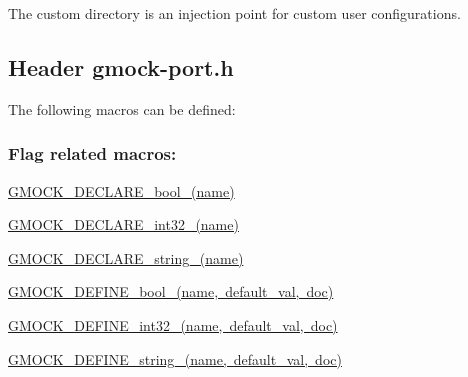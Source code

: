 The custom directory is an injection point for custom user configurations.

\subsection*{Header {\ttfamily gmock-\/port.\+h}}

The following macros can be defined\+:

\subsubsection*{Flag related macros\+:}


\begin{DoxyItemize}
\item {\ttfamily \mbox{\hyperlink{gmock-port_8h_a7a0a953221ea8ef5aaa6c644a48af599}{G\+M\+O\+C\+K\+\_\+\+D\+E\+C\+L\+A\+R\+E\+\_\+bool\+\_\+(name)}}}
\item {\ttfamily \mbox{\hyperlink{gmock-port_8h_adeb7f0a8d842d1d541615763835af3f9}{G\+M\+O\+C\+K\+\_\+\+D\+E\+C\+L\+A\+R\+E\+\_\+int32\+\_\+(name)}}}
\item {\ttfamily \mbox{\hyperlink{gmock-port_8h_a35af08c45131cf68d78446cb8cfe40fe}{G\+M\+O\+C\+K\+\_\+\+D\+E\+C\+L\+A\+R\+E\+\_\+string\+\_\+(name)}}}
\item {\ttfamily \mbox{\hyperlink{gmock-port_8h_a470be328fabbeef3987127adc18a1433}{G\+M\+O\+C\+K\+\_\+\+D\+E\+F\+I\+N\+E\+\_\+bool\+\_\+(name, default\+\_\+val, doc)}}}
\item {\ttfamily \mbox{\hyperlink{gmock-port_8h_a19d91081ff0aaab2f60ef1dc2d6e6b34}{G\+M\+O\+C\+K\+\_\+\+D\+E\+F\+I\+N\+E\+\_\+int32\+\_\+(name, default\+\_\+val, doc)}}}
\item {\ttfamily \mbox{\hyperlink{gmock-port_8h_ad6badbf90e5a813e2bd5668fc6b6a8f7}{G\+M\+O\+C\+K\+\_\+\+D\+E\+F\+I\+N\+E\+\_\+string\+\_\+(name, default\+\_\+val, doc)}}} 
\end{DoxyItemize}